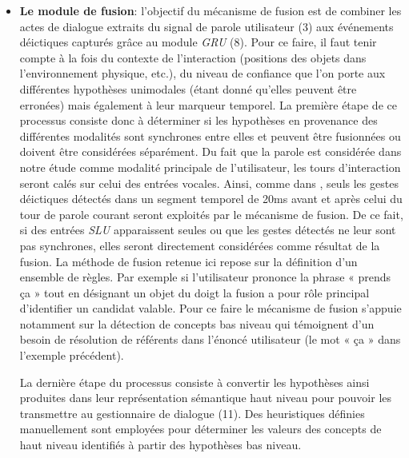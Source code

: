 \documentclass[a4paper,11pt,twoside]{StyleThese}
\begin{document}
\begin{itemize}

\item \textbf{Le module de fusion}: l’objectif du mécanisme de fusion est de combiner les actes de dialogue extraits du
signal de parole utilisateur (3) aux événements déictiques capturés grâce au module \textit{GRU} (8).
Pour ce faire, il faut tenir compte à la fois du contexte de l’interaction (positions des objets dans l’environnement physique, etc.), du niveau de confiance que l’on porte aux différentes hypothèses unimodales (étant donné qu’elles peuvent être erronées) mais également à leur marqueur temporel.
La première étape de ce processus consiste donc à déterminer si les hypothèses en
provenance des différentes modalités sont synchrones entre elles et peuvent être fusionnées ou doivent être considérées séparément. Du fait que la parole est considérée dans notre étude comme modalité principale de l’utilisateur, les tours d’interaction seront calés sur celui des entrées vocales. Ainsi, comme dans \cite{Holzapfel2004}, seuls les gestes déictiques détectés dans un segment temporel de 20ms avant et après celui du tour de parole courant seront exploités par le mécanisme de fusion. De ce fait, si des entrées \textit{SLU} apparaissent seules ou que les gestes détectés ne leur sont pas synchrones, elles seront directement considérées comme résultat de la fusion. La méthode de fusion retenue ici repose sur la définition d’un ensemble
de règles.
Par exemple si l’utilisateur prononce la
phrase « prends ça » tout en désignant un objet du doigt la fusion a pour rôle principal d’identifier un candidat valable. Pour ce faire le mécanisme de fusion s’appuie notamment sur la détection de concepts bas niveau qui témoignent d’un besoin de résolution de référents dans l’énoncé utilisateur (le mot « ça » dans l’exemple précédent).

La dernière étape du processus consiste à convertir les hypothèses ainsi produites
dans leur représentation sémantique haut niveau pour pouvoir les transmettre au gestionnaire de dialogue (11).
Des heuristiques définies manuellement sont employées pour déterminer les valeurs
des concepts de haut niveau identifiés à partir des hypothèses bas niveau.
\end{itemize}
\end{document}
